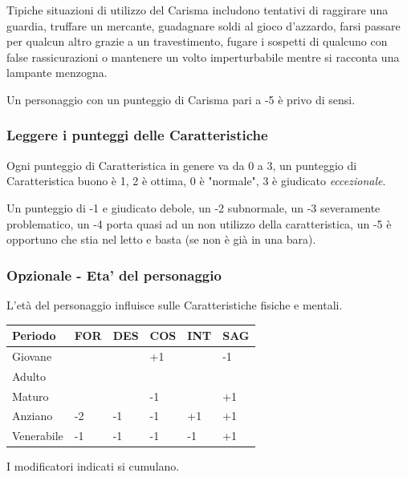 \begin{multicols}{2}
Tipiche situazioni di utilizzo del Carisma includono tentativi di raggirare una guardia, truffare un mercante, guadagnare soldi al gioco d'azzardo, farsi passare per qualcun altro grazie a un travestimento, fugare i sospetti di qualcuno con false rassicurazioni o mantenere un volto imperturbabile mentre si racconta una lampante menzogna.

Un personaggio con un punteggio di Carisma pari a -5 è privo di sensi.

\subsubsection{Leggere i punteggi delle Caratteristiche}\label{leggereipunteggidellecaratteristiche}

Ogni punteggio di Caratteristica in genere va da 0 a 3, un punteggio di Caratteristica buono è 1, 2 è ottima, 0 è "normale", 3 è giudicato \emph{eccezionale}.

Un punteggio di -1 e giudicato debole, un -2 subnormale, un -3 severamente problematico, un -4 porta quasi ad un non utilizzo della caratteristica, un -5 è opportuno che stia nel letto e basta (se non è già in una bara).

\subsubsection{Opzionale - Eta' del personaggio}\hypertarget{etadelpersonaggio}{} \label{etadelpersonaggio}

L'età del personaggio influisce sulle Caratteristiche fisiche e mentali.

\medskip

\noindent\begin{tabular}{llllll}
\textbf{Periodo} & \textbf{FOR} & \textbf{DES} & \textbf{COS} & \textbf{INT} & \textbf{SAG}\\
\hline
Giovane& & & +1 & & -1 \\
\hline
Adulto& & &  & & \\
\hline
Maturo& & & -1 & & +1 \\
\hline
Anziano& -2 & -1 & -1 & +1 & +1 \\
\hline
Venerabile&-1 & -1 & -1 & -1 & +1 \\
\end{tabular}

\medskip

I modificatori indicati si cumulano.


\end{multicols}
